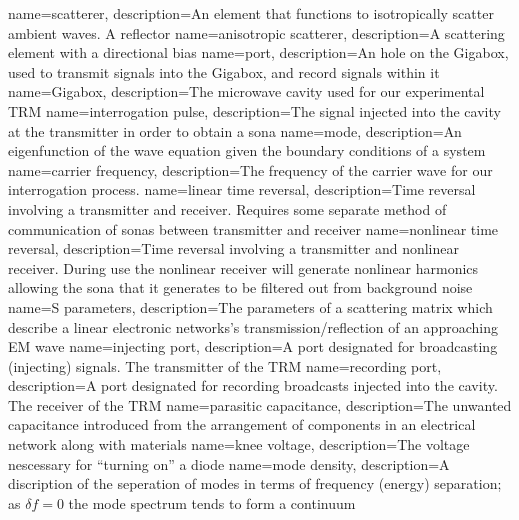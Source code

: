 {
   name=scatterer,
  description={An element that functions to isotropically scatter ambient waves. A reflector}
}
{
   name=anisotropic scatterer,
  description={A scattering element with a directional bias}
}
{
   name=port,
  description={An hole on the Gigabox, used to transmit signals into the Gigabox, and record signals within it}
}
{
   name=Gigabox,
  description={The microwave cavity used for our experimental TRM}
}
{
   name=interrogation pulse,
  description={The signal injected into the cavity at the transmitter in order to obtain a sona}
}
{
   name=mode,
  description={An eigenfunction of the wave equation given the boundary conditions of a system}
}
{
   name=carrier frequency,
  description={The frequency of the carrier wave for our interrogation process.}
}
{
   name=linear time reversal,
  description={Time reversal involving a transmitter and receiver.  Requires some separate method of communication of sonas between transmitter and receiver}
}
{
   name=nonlinear time reversal,
  description={Time reversal involving a transmitter and nonlinear receiver.  During use the nonlinear receiver will generate nonlinear harmonics allowing the sona that it generates to be filtered out from background noise}
}
{
   name=S parameters,
  description={The parameters of a scattering matrix which describe a linear electronic networks's transmission/reflection of an approaching EM wave}
}
{
   name=injecting port,
  description={A port designated for broadcasting (injecting) signals. The transmitter of the TRM}
}
{
   name=recording port,
  description={A port designated for recording broadcasts injected into the cavity. The receiver of the TRM}
}
{
   name=parasitic capacitance,
  description={The unwanted capacitance introduced from the arrangement of components in an electrical network along with materials}
}
{
   name=knee voltage,
  description={The voltage nescessary for ``turning on'' a diode}
}
{
   name=mode density,
  description={A discription of the seperation of modes in terms of frequency (energy) separation; as $\delta f = 0$ the mode spectrum tends to form a continuum}
}
